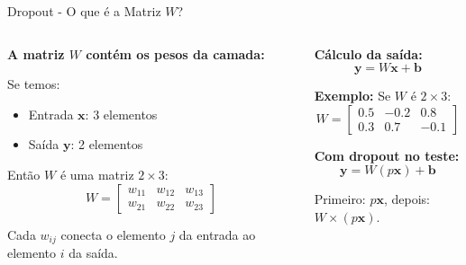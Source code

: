 \documentclass{beamer}
\begin{document}
\begin{frame}{Dropout - O que é a Matriz $W$?}
\begin{columns}[T]
\begin{column}{0.48\textwidth}
\textbf{A matriz $W$ contém os pesos da camada:}
\vspace{0.2cm}

Se temos:
\begin{itemize}
    \item Entrada $\mathbf{x}$: 3 elementos
    \item Saída $\mathbf{y}$: 2 elementos
\end{itemize}

Então $W$ é uma matriz $2 \times 3$:
\[
W = \begin{bmatrix} 
w_{11} & w_{12} & w_{13} \\
w_{21} & w_{22} & w_{23}
\end{bmatrix}
\]

Cada $w_{ij}$ conecta o elemento $j$ da entrada ao elemento $i$ da saída.
\end{column}

\begin{column}{0.48\textwidth}
\textbf{Cálculo da saída:}
\[
\mathbf{y} = W\mathbf{x} + \mathbf{b}
\]

\textbf{Exemplo:} Se $W$ é $2 \times 3$:
{\small
\[
W = \begin{bmatrix} 
0.5 & -0.2 & 0.8 \\
0.3 & 0.7 & -0.1
\end{bmatrix}
\]
}

\textbf{Com dropout no teste:}
\[
\mathbf{y} = W(p\mathbf{x}) + \mathbf{b}
\]

Primeiro: $p\mathbf{x}$, depois: $W \times (p\mathbf{x})$.
\end{column}
\end{columns}
\end{frame}
\end{document}
